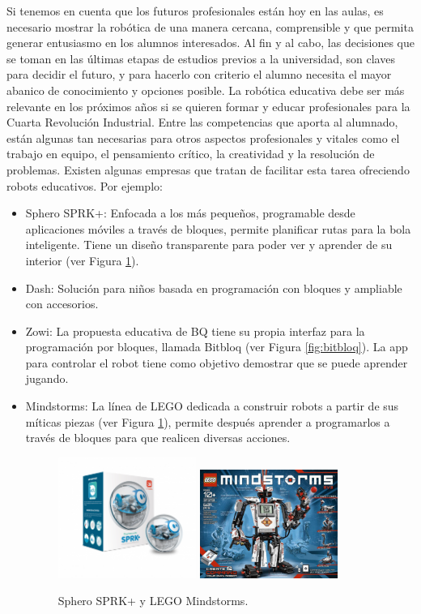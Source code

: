 \documentclass[12pt,spanish,chapterprefix, numbers=noenddot]{book}
\numberwithin{equation}{section}
\numberwithin{figure}{section}
\begin{document}
Si tenemos en cuenta que los futuros profesionales están hoy en las aulas, es necesario mostrar la robótica de una manera cercana, comprensible y que permita generar entusiasmo en los alumnos interesados. Al fin y al cabo, las decisiones que se toman en las últimas etapas de estudios previos a la universidad, son claves para decidir el futuro, y para hacerlo con criterio el alumno necesita el mayor abanico de conocimiento y opciones posible. 
La robótica educativa debe ser más relevante en los próximos años si se quieren formar y educar profesionales para la Cuarta Revolución Industrial. Entre las competencias que aporta al alumnado, están algunas tan necesarias para otros aspectos profesionales y vitales como el trabajo en equipo, el pensamiento crítico, la creatividad y la resolución de problemas. Existen algunas empresas que tratan de facilitar esta tarea ofreciendo robots educativos. Por ejemplo: 
\begin{itemize}
    \item Sphero SPRK+: Enfocada a los más pequeños, programable desde aplicaciones móviles a través de bloques, permite planificar rutas para la bola inteligente. Tiene un diseño transparente para poder ver y aprender de su interior (ver Figura \ref{fig:sphero}).  
    \item Dash: Solución para niños basada en programación con bloques y ampliable con accesorios. 
    \item Zowi: La propuesta educativa de BQ tiene su propia interfaz para la programación por bloques, llamada Bitbloq (ver Figura \ref{fig:bitbloq}). La app para controlar el robot tiene como objetivo demostrar que se puede aprender jugando.
    \item Mindstorms: La línea de LEGO dedicada a construir robots a partir de sus míticas piezas (ver Figura \ref{fig:sphero}), permite después aprender a programarlos a través de bloques para que realicen diversas acciones. 
    \begin{figure}[h!]
    \centering
    \includegraphics[width=4.5cm]{Figs/spheroedu-sprkplus.png}
    \includegraphics[width=4.5cm]{Figs/mindstorms.jpg}
    \par
    \caption{\label{fig:sphero}Sphero SPRK+ y LEGO Mindstorms.}
    \end{figure}
\end{itemize}
\end{document}
